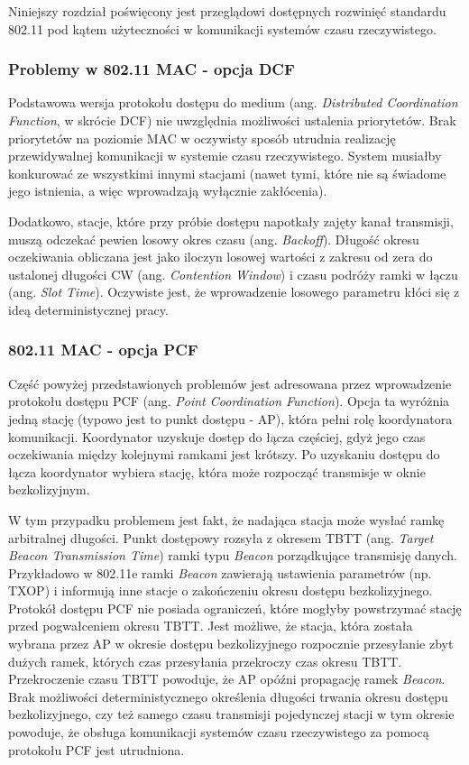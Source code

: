 Niniejszy rozdział poświęcony jest przeglądowi dostępnych rozwinięć standardu 802.11 pod kątem użyteczności w komunikacji systemów czasu rzeczywistego.

\subsubsection{Problemy w 802.11 MAC - opcja DCF}

Podstawowa wersja protokołu dostępu do medium (ang. \emph{Distributed Coordination Function}, w skrócie DCF) nie uwzględnia możliwości ustalenia priorytetów. Brak priorytetów na poziomie MAC w oczywisty sposób utrudnia realizację przewidywalnej komunikacji w systemie czasu rzeczywistego. System musiałby konkurować ze wszystkimi innymi stacjami (nawet tymi, które nie są świadome jego istnienia, a więc wprowadzają wyłącznie zakłócenia). 

Dodatkowo, stacje, które przy próbie dostępu napotkały zajęty kanał transmisji, muszą odczekać pewien losowy okres czasu (ang. \emph{Backoff}). Długość okresu oczekiwania obliczana jest jako iloczyn losowej wartości z zakresu od zera do ustalonej długości CW (ang. \emph{Contention Window}) i czasu podróży ramki w łączu (ang. \emph{Slot Time}). Oczywiste jest, że wprowadzenie losowego parametru kłóci się z ideą deterministycznej pracy.

\subsubsection{802.11 MAC - opcja PCF}

Część powyżej przedstawionych problemów jest adresowana przez wprowadzenie protokołu dostępu PCF (ang. \emph{Point Coordination Function}). Opcja ta wyróżnia jedną stację (typowo jest to punkt dostępu - AP), która pełni rolę koordynatora komunikacji. Koordynator uzyskuje dostęp do łącza częściej, gdyż jego czas oczekiwania między kolejnymi ramkami jest krótszy. Po uzyskaniu dostępu do łącza koordynator wybiera stację, która może rozpocząć transmisje w oknie bezkolizyjnym. 

W tym przypadku problemem jest fakt, że nadająca stacja może wysłać ramkę arbitralnej długości. Punkt dostępowy rozsyła z okresem TBTT (ang. \emph{Target Beacon Transmission Time}) ramki typu \emph{Beacon} 
porządkujące transmisję danych. Przykładowo w 802.11e ramki \emph{Beacon} zawierają ustawienia parametrów (np. TXOP) i
informują inne stacje o zakończeniu okresu dostępu bezkolizyjnego.
Protokół dostępu PCF nie posiada ograniczeń, które mogłyby powstrzymać stację przed pogwałceniem okresu TBTT. Jest
możliwe, że stacja, która została wybrana przez AP w okresie dostępu bezkolizyjnego rozpocznie przesyłanie zbyt dużych ramek,
których czas przesyłania przekroczy czas okresu TBTT. Przekroczenie czasu TBTT powoduje, że AP opóźni propagację ramek
\emph{Beacon}. Brak możliwości deterministycznego określenia długości trwania okresu dostępu bezkolizyjnego, czy też samego
czasu transmisji pojedynczej stacji w tym okresie powoduje, że obsługa komunikacji systemów czasu rzeczywistego za pomocą
protokołu PCF jest utrudniona.

